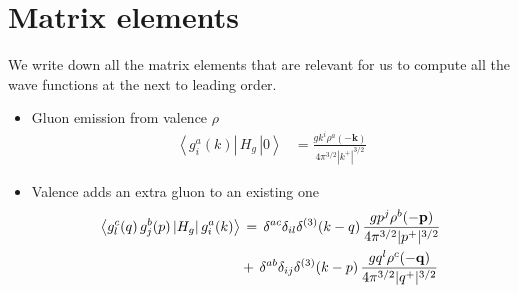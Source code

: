 \documentclass[a4paper,11pt]{article}
\def\v#1{\mathbf{#1}}
\begin{document}
\section{Matrix elements} \label{sec:App3}
We write down all the matrix elements that are relevant for us to compute all the wave functions at the next to leading order. 

\begin{itemize}
  
  \item   
    Gluon emission from valence $\rho$
    \begin{align}
      \label{m1}
      \left\langle g_{i}^{a}(k)\left|\, H_{g}\,\right|0\right\rangle &= 
      \frac{g{k}^{i}\rho^{a}(-\v{k})}{4\pi^{3/2}|k^{+}|^{3/2}} 
    \end{align}
  
  \item Valence adds an extra gluon to an existing one 
    \begin{align}
      \left\langle g_{l}^{c}(q)\, g_{j}^{b}(p)\left|H_{g}\right|g_{i}^{a}(k)\right\rangle &\,=\,
      \delta^{ac}\delta_{il}\delta^{(3)}(k-q)\,\frac{g {p}^{j}\rho^{b}(-\mathbf{p})}{4\pi^{3/2}|p^{+}|^{3/2}}
      \,\notag \\ & +\,\delta^{ab}\delta_{ij}\delta^{(3)}(k-p)\,\frac{g {q}^{l}\rho^{c}(-\mathbf{q})}{4\pi^{3/2}|q^{+}|^{3/2}}
      \label{m2}
    \end{align}


\end{itemize}
\end{document}
